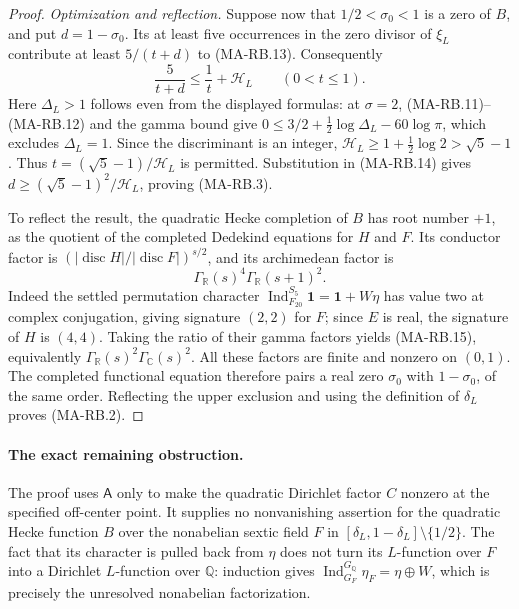 \begin{proof}
\emph{Optimization and reflection.}
Suppose now that $1/2<\sigma_0<1$ is a zero of $B$, and put
$d=1-\sigma_0$.  Its at least five occurrences in the
zero divisor of $\xi_L$ contribute at least $5/(t+d)$
to (MA-RB.13).  Consequently
\[
                  \frac5{t+d}\le\frac1t+\mathcal H_L
                      \qquad(0<t\le1).
 \tag{MA-RB.14}
\]
Here $\Delta_L>1$ follows even from the displayed formulas:
at $\sigma=2$, (MA-RB.11)--(MA-RB.12) and the gamma bound give
$0\le3/2+\frac12\log\Delta_L-60\log\pi$, which excludes
$\Delta_L=1$.  Since the discriminant is an integer,
$\mathcal H_L\ge1+\frac12\log2>\sqrt5-1$.
Thus $t=(\sqrt5-1)/\mathcal H_L$ is permitted.
Substitution in (MA-RB.14) gives
$d\ge(\sqrt5-1)^2/\mathcal H_L$, proving (MA-RB.3).

To reflect the result, the quadratic Hecke completion of $B$
has root number $+1$, as the quotient of the completed
Dedekind equations for $H$ and $F$.
Its conductor factor is
$(|\operatorname{disc}H|/|\operatorname{disc}F|)^{s/2}$,
and its archimedean factor is
\[
                \Gamma_{\mathbb R}(s)^4
                    \Gamma_{\mathbb R}(s+1)^2.
 \tag{MA-RB.15}
\]
Indeed the settled permutation character
$\operatorname{Ind}_{F_{20}}^{S_5}\mathbf1=\mathbf1+W\eta$
has value two at complex conjugation, giving signature
$(2,2)$ for $F$; since $E$ is real, the signature of $H$
is $(4,4)$.  Taking the ratio of their gamma factors yields
(MA-RB.15), equivalently $\Gamma_{\mathbb R}(s)^2
\Gamma_{\mathbb C}(s)^2$.
All these factors are finite and nonzero on $(0,1)$.
The completed functional equation therefore pairs a real
zero $\sigma_0$ with $1-\sigma_0$, of the same order.
Reflecting the upper exclusion and using the definition
of $\delta_L$ proves (MA-RB.2).
\end{proof}

\paragraph{The exact remaining obstruction.}
The proof uses $\mathsf A$ only to make the quadratic Dirichlet
factor $C$ nonzero at the specified off-center point.
It supplies no nonvanishing assertion for the quadratic Hecke
function $B$ over the nonabelian sextic field $F$ in
$[\delta_L,1-\delta_L]\setminus\{1/2\}$.
The fact that its character is pulled back from $\eta$ does
not turn its $L$-function over $F$ into a Dirichlet
$L$-function over $\mathbb Q$: induction gives
$\operatorname{Ind}_{G_F}^{G_{\mathbb Q}}\eta_F=\eta\oplus W$,
which is precisely the unresolved nonabelian factorization.


